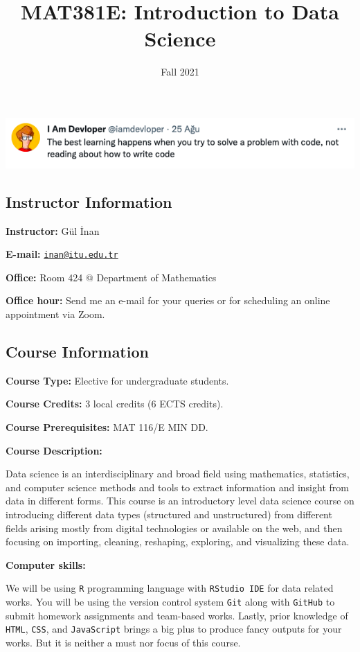 \documentclass[
  12pt,
]{article}
\title{MAT381E: Introduction to Data Science}
\author{}
\date{\vspace{-2.5em}Fall 2021}
\begin{document}
\maketitle

\includegraphics{developer.png}

\hypertarget{instructor-information}{%
\subsection{Instructor Information}\label{instructor-information}}

\textbf{Instructor:} Gül İnan

\textbf{E-mail:}
\href{mailto:inan@itu.edu.tr}{\nolinkurl{inan@itu.edu.tr}}

\textbf{Office:} Room 424 @ Department of Mathematics

\textbf{Office hour:} Send me an e-mail for your queries or for
scheduling an online appointment via Zoom.

\hypertarget{course-information}{%
\subsection{Course Information}\label{course-information}}

\textbf{Course Type:} Elective for undergraduate students.

\textbf{Course Credits:} 3 local credits (6 ECTS credits).

\textbf{Course Prerequisites:} MAT 116/E MIN DD.

\textbf{Course Description:}

Data science is an interdisciplinary and broad field using mathematics,
statistics, and computer science methods and tools to extract
information and insight from data in different forms. This course is an
introductory level data science course on introducing different data
types (structured and unstructured) from different fields arising mostly
from digital technologies or available on the web, and then focusing on
importing, cleaning, reshaping, exploring, and visualizing these data.

\textbf{Computer skills:}

We will be using \texttt{R} programming language with
\texttt{RStudio\ IDE} for data related works. You will be using the
version control system \texttt{Git} along with \texttt{GitHub} to submit
homework assignments and team-based works. Lastly, prior knowledge of
\texttt{HTML}, \texttt{CSS}, and \texttt{JavaScript} brings a big plus
to produce fancy outputs for your works. But it is neither a must nor
focus of this course.
\end{document}
